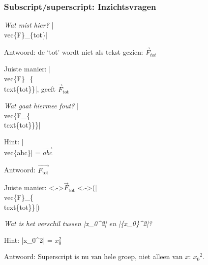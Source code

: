 \documentclass{cursuspresentatie}
\begin{document}
\begin{frame}
	\frametitle{Subscript/superscript: Inzichtsvragen}

	\emph{Wat mist hier?} \hll|\\vec\{F\}_\{tot\}|
	
	\pause
	Antwoord: de `tot' wordt niet als tekst gezien: $ \vec{F}_{tot} $

	Juiste manier: \hll|\\vec\{F\}_\{\\text\{tot\}\}|, geeft $ \vec{F}_{\text{tot}} $

	\medskip

	\pause
	\emph{Wat gaat hiermee fout?} \hll|\\vec\{F_\{\\text\{tot\}\}\}|

	\pause Hint: \hll|\\vec\{abc\}| = $ \vec{abc} $

	\pause Antwoord: $ \vec{F_{\text{tot}}} $ \uncover<+->{(\hll|\\vec\{F_\{\\text\{tot\}\}\}|)}

	Juiste manier: \uncover<.->{$ \vec{F}_{\text{tot}} $} \uncover<.->{(\hll|\\vec\{F\}_\{\\text\{tot\}\}|)}

	\medskip

	\pause
	\emph{Wat is het verschil tussen \textnormal{\hll|x_0^2|} en \textnormal{\hll|\{x_0\}^2|}?}

	\pause Hint: \hll|x_0^2| = $ x_0^2 $

	\pause Antwoord: Superscript is nu van hele groep, niet alleen van $ x $: $ {x_0}^2 $.

\end{frame}
\end{document}
